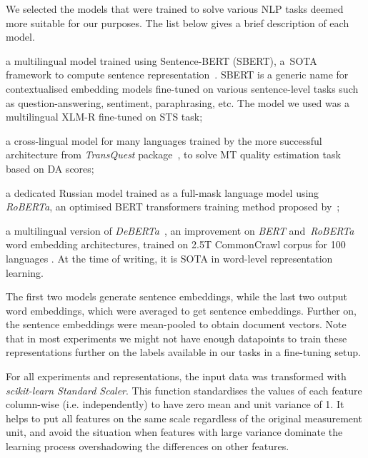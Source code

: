 We selected the models that were trained to solve various NLP tasks deemed more suitable for our purposes. The list below gives a brief description of each model. 
\begin{description}\compresslist{}
	\item[stsb-xlm-r-m:] a multilingual model trained using Sentence-BERT (SBERT), a~\gls{SOTA} framework to compute sentence representation~\cite{Reimers2019}. SBERT is a generic name for contextualised embedding models fine-tuned on various sentence-level tasks such as question-answering, sentiment, paraphrasing, etc. The model we used was a multilingual XLM-R fine-tuned on \gls{STS} task;
	
	\item[TQmono-m:] a cross-lingual model for many languages trained by the more successful architecture from \textit{TransQuest} package~\cite{Ranasinghe2020}, to solve MT quality estimation task based on DA scores;
	
	\item[ruRoberta:] a dedicated Russian model trained as a full-mask language model using \textit{RoBERTa}, an optimised BERT transformers training method proposed by~\cite{Liu2019};
	
	\item[mdeberta3:] a multilingual version of \textit{DeBERTa}~\cite{He2021}, an improvement on \textit{BERT} and~\textit{RoBERTa} word embedding architectures, trained on 2.5T CommonCrawl corpus for 100 languages . At the time of writing, it is \gls{SOTA} in word-level representation learning. 
\end{description}

The first two models generate sentence embeddings, while the last two output word embeddings, which were averaged to get sentence embeddings. Further on, the sentence embeddings were mean-pooled to obtain document vectors. 
Note that in most experiments we might not have enough datapoints to train these representations further on the labels available in our tasks in a fine-tuning setup. %

For all experiments and representations, the input data was transformed with \textit{scikit-learn Standard Scaler}. This function standardises the values of each feature column-wise (i.e. independently) to have zero mean and unit variance of 1. It helps to put all features on the same scale regardless of the original measurement unit, and avoid the situation when features with large variance dominate the learning process overshadowing the differences on other features.

